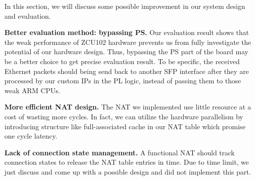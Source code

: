 
In this section, we will discuss some possible improvement in our system design and evaluation.

\textbf{Better evaluation method: bypassing PS.} Our evaluation result shows that the weak performance of ZCU102 hardware prevents us from fully investigate the potential of our hardware design. Thus, bypassing the PS part of the board may be a better choice to get precise evaluation result. To be specific, the received Ethernet packets should being send back to another SFP interface after they are processed by our custom IPs in the PL logic, instead of passing them to those weak ARM CPUs.

\textbf{More efficient NAT design.} The NAT we implemented use little resource at a cost of wasting more cycles. In fact, we can utilize the hardware parallelism by introducing structure like full-associated cache in our NAT table which promise one cycle latency.

\textbf{Lack of connection state management.} A functional NAT should track connection states to release the NAT table entries in time. Due to time limit, we just discuss and come up with a possible design and did not implement this part. 